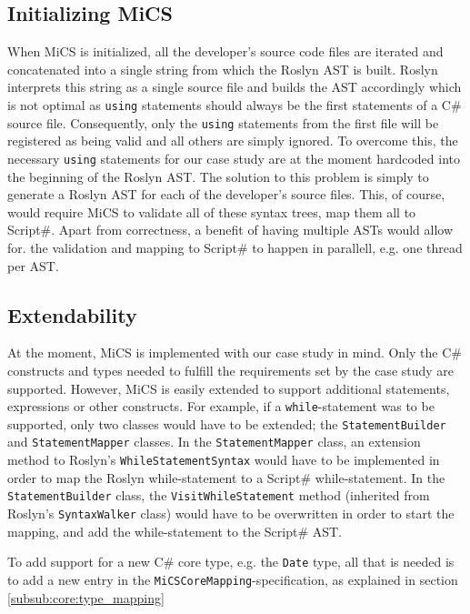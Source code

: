 
\subsection{Initializing MiCS} %
\label{ssub:collecting_source_code}
When MiCS is initialized, all the developer's source code files are iterated and concatenated into a single string from which the Roslyn AST is built. Roslyn interprets this string as a single source file and builds the AST accordingly which is not optimal as \texttt{using} statements should always be the first statements of a C\# source file. Consequently, only the \texttt{using} statements from the first file will be registered as being valid and all others are simply ignored. To overcome this, the necessary \texttt{using} statements for our case study are at the moment hardcoded into the beginning of the Roslyn AST. The solution to this problem is simply to generate a Roslyn AST for each of the developer's source files. This, of course, would require MiCS to validate all of these syntax trees, map them all to Script\#. Apart from correctness, a benefit of having multiple ASTs would allow for. the validation and mapping to Script\# to happen in parallell, e.g. one thread per AST.

\subsection{Extendability} %
\label{sub:extendability}
At the moment, MiCS is implemented with our case study in mind. Only the C\# constructs and types needed to fulfill the requirements set by the case study are supported. However, MiCS is easily extended to support additional statements, expressions or other constructs. For example, if a \texttt{while}-statement was to be supported, only two classes would have to be extended; the \texttt{StatementBuilder} and \texttt{StatementMapper} classes. In the \texttt{StatementMapper} class, an extension method to Roslyn's \texttt{WhileStatementSyntax} would have to be implemented in order to map the Roslyn while-statement to a Script\# while-statement. In the \texttt{StatementBuilder} class, the \texttt{VisitWhileStatement} method (inherited from Roslyn's \texttt{SyntaxWalker} class) would have to be overwritten in order to start the mapping, and add the while-statement to the Script\# AST.

To add support for a new C\# core type, e.g. the \texttt{Date} type, all that is needed is to add a new entry in the \texttt{MiCSCoreMapping}-specification, as explained in section \ref{subsub:core:type_mapping}

